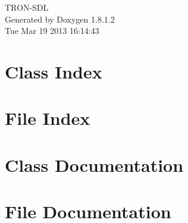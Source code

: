 \documentclass{book}
\begin{document}
\hypersetup{pageanchor=false,citecolor=blue}
\begin{titlepage}
\vspace*{7cm}
\begin{center}
{\Large T\-R\-O\-N-\/\-S\-D\-L }\\
\vspace*{1cm}
{\large Generated by Doxygen 1.8.1.2}\\
\vspace*{0.5cm}
{\small Tue Mar 19 2013 16:14:43}\\
\end{center}
\end{titlepage}
\clearemptydoublepage
{}
\tableofcontents
\clearemptydoublepage
{}
\hypersetup{pageanchor=true,citecolor=blue}
\chapter{Class Index}

\chapter{File Index}

\chapter{Class Documentation}








\chapter{File Documentation}















\printindex
\end{document}
